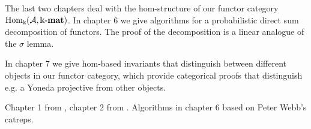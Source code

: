 The last two chapters deal with the hom-structure of our functor category $\mathrm{Hom_{\Bbbk}}(\mathcal{A},\Bbbk\textnormal{-}\mathbf{mat})$. In chapter 6 we give
algorithms for a probabilistic direct sum decomposition of functors. The proof of the decomposition is a linear
analogue of the $\sigma$ lemma.

In chapter 7 we give hom-based invariants that distinguish between different objects in our functor category, which provide 
categorical proofs that distinguish e.g. a Yoneda projective from other objects.

Chapter 1 from \cite{[context]}, chapter 2 from \cite{[Posur]}. Algorithms in chapter 6 based on Peter Webb's catreps.
